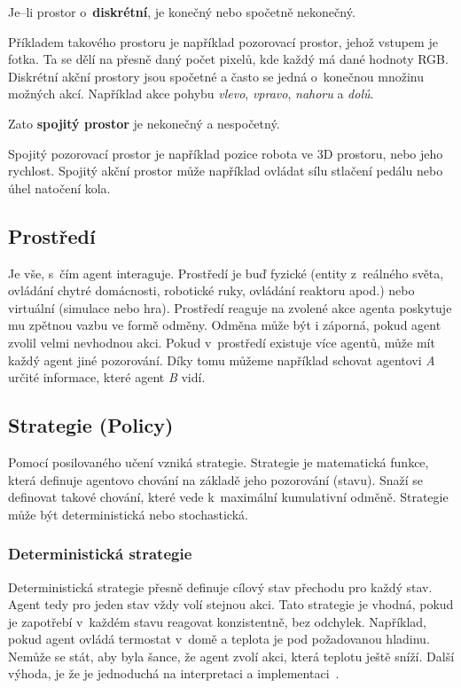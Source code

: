 Je--li prostor o~\textbf{diskrétní}, je konečný nebo spočetně nekonečný.

Příkladem takového prostoru je například pozorovací prostor, jehož vstupem je fotka.
Ta se dělí na přesně daný počet pixelů, kde každý má dané hodnoty RGB.
Diskrétní akční prostory jsou spočetné a často se jedná o~konečnou množinu možných akcí.
Například akce pohybu \textit{vlevo}, \textit{vpravo}, \textit{nahoru} a \textit{dolů}.

Zato \textbf{spojitý prostor} je nekonečný a nespočetný.

Spojitý pozorovací prostor je například pozice robota ve 3D prostoru, nebo jeho rychlost.
Spojitý akční prostor může například ovládat sílu stlačení pedálu nebo úhel natočení kola.

\subsection{Prostředí}\label{subsec:prostredi2}

Je vše, s~čím agent interaguje.
Prostředí je buď fyzické (entity z~reálného světa, ovládání chytré domácnosti, robotické ruky, ovládání reaktoru apod.) nebo virtuální (simulace nebo hra).
Prostředí reaguje na zvolené akce agenta poskytuje mu zpětnou vazbu ve formě odměny.
Odměna může být i záporná, pokud agent zvolil velmi nevhodnou akci.
Pokud v~prostředí existuje více agentů, může mít každý agent jiné pozorování.
Díky tomu můžeme například schovat agentovi \textit{A} určité informace, které agent \textit{B} vidí.

\subsection{Strategie (Policy)}\label{subsec:strategie}

Pomocí posilovaného učení vzniká strategie.
Strategie je matematická funkce, která definuje agentovo chování na základě jeho pozorování (stavu).
Snaží se definovat takové chování, které vede k~maximální kumulativní odměně.
Strategie může být deterministická nebo stochastická.

  \subsubsection*{Deterministická strategie}
  
  Deterministická strategie přesně definuje cílový stav přechodu pro každý stav.
  Agent tedy pro jeden stav vždy volí stejnou akci.
  Tato strategie je vhodná, pokud je zapotřebí v~každém stavu reagovat konzistentně, bez odchylek.
  Například, pokud agent ovládá termostat v~domě a teplota je pod požadovanou hladinu.
  Nemůže se stát, aby byla šance, že agent zvolí akci, která teplotu ještě sníží.
  Další výhoda, je že je jednoduchá na interpretaci a implementaci~\cite{Policies}.

